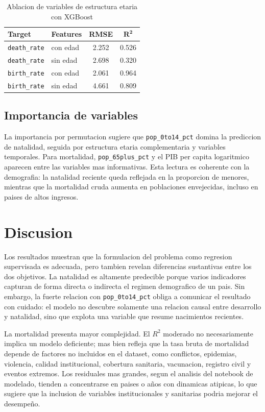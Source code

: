 \documentclass[conference]{IEEEtran}
\begin{document}
\begin{table}[htbp]
\caption{Ablacion de variables de estructura etaria con XGBoost}
\label{tab:ablacion}
\centering
\begin{tabular}{llcc}
\toprule
\textbf{Target} & \textbf{Features} & \textbf{RMSE} & \(\mathbf{R^2}\) \\
\midrule
\texttt{death\_rate} & con edad & 2.252 & 0.526 \\
\texttt{death\_rate} & sin edad & 2.698 & 0.320 \\
\texttt{birth\_rate} & con edad & 2.061 & 0.964 \\
\texttt{birth\_rate} & sin edad & 4.661 & 0.809 \\
\bottomrule
\end{tabular}
\end{table}

\subsection{Importancia de variables}

La importancia por permutacion sugiere que \texttt{pop\_0to14\_pct} domina la prediccion de natalidad, seguida por estructura etaria complementaria y variables temporales. Para mortalidad, \texttt{pop\_65plus\_pct} y el PIB per capita logaritmico aparecen entre las variables mas informativas. Esta lectura es coherente con la demografia: la natalidad reciente queda reflejada en la proporcion de menores, mientras que la mortalidad cruda aumenta en poblaciones envejecidas, incluso en paises de altos ingresos.

\section{Discusion}

Los resultados muestran que la formulacion del problema como regresion supervisada es adecuada, pero tambien revelan diferencias sustantivas entre los dos objetivos. La natalidad es altamente predecible porque varios indicadores capturan de forma directa o indirecta el regimen demografico de un pais. Sin embargo, la fuerte relacion con \texttt{pop\_0to14\_pct} obliga a comunicar el resultado con cuidado: el modelo no descubre solamente una relacion causal entre desarrollo y natalidad, sino que explota una variable que resume nacimientos recientes.

La mortalidad presenta mayor complejidad. El \(R^2\) moderado no necesariamente implica un modelo deficiente; mas bien refleja que la tasa bruta de mortalidad depende de factores no incluidos en el dataset, como conflictos, epidemias, violencia, calidad institucional, cobertura sanitaria, vacunacion, registro civil y eventos extremos. Los residuales mas grandes, segun el analisis del notebook de modelado, tienden a concentrarse en paises o años con dinamicas atipicas, lo que sugiere que la inclusion de variables institucionales y sanitarias podria mejorar el desempeño.
\end{document}
